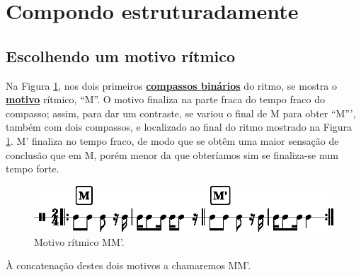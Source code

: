 
\section{Compondo estruturadamente}



\subsection{Escolhendo um motivo rítmico}
Na Figura \ref{fig:motivoritmico1}, 
nos  dois  primeiros \hyperref[subsec:compassobinario]{\textbf{compassos binários}} do ritmo,
 se mostra o  \hyperref[sec:Motivo]{\textbf{motivo}} rítmico, ``M''. 
O motivo finaliza na parte fraca do tempo fraco do compasso; assim,
para dar um contraste, se variou o final de M para obter ``M''', 
também com dois compassos, e localizado ao final do ritmo mostrado na Figura \ref{fig:motivoritmico1}. 
M' finaliza no tempo fraco, de modo que se obtêm uma maior sensação de conclusão que em M, 
porém menor da que obteríamos sim se finaliza-se num tempo forte.
\begin{figure}[H]
     \centering
     \includegraphics[width=\textwidth]{chapters/cap-musica-topicos/motivo-ritmico-1.eps}
     \caption{Motivo rítmico MM'.}
     \label{fig:motivoritmico1}
\end{figure}
À concatenação destes dois motivos a chamaremos MM'.


